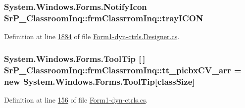 \hypertarget{class_sr_p___classroom_inq_1_1frm_classrrom_inq_a8c062d5fe665631b364688c76e36e7f7}{
\subsubsection[{tray\-I\-C\-O\-N}]{\setlength{\rightskip}{0pt plus 5cm}\-System.\-Windows.\-Forms.\-Notify\-Icon {\bf \-Sr\-P\-\_\-\-Classroom\-Inq\-::frm\-Classrrom\-Inq\-::tray\-I\-C\-O\-N}}}
\label{class_sr_p___classroom_inq_1_1frm_classrrom_inq_a8c062d5fe665631b364688c76e36e7f7}


\-Definition at line \hyperlink{_form1-dyn-ctrls_8_designer_8cs_source_l01884}{1884} of file \hyperlink{_form1-dyn-ctrls_8_designer_8cs_source}{\-Form1-\/dyn-\/ctrls.\-Designer.\-cs}.

\hypertarget{class_sr_p___classroom_inq_1_1frm_classrrom_inq_a2b443a71216ac1b9a63f9db496161a4d}{
\subsubsection[{tt\-\_\-picbx\-C\-V\-\_\-arr}]{\setlength{\rightskip}{0pt plus 5cm}\-System.\-Windows.\-Forms.\-Tool\-Tip \mbox{[}$\,$\mbox{]} {\bf \-Sr\-P\-\_\-\-Classroom\-Inq\-::frm\-Classrrom\-Inq\-::tt\-\_\-picbx\-C\-V\-\_\-arr} = new \-System.\-Windows.\-Forms.\-Tool\-Tip\mbox{[}{\bf class\-Size}\mbox{]}}}
\label{class_sr_p___classroom_inq_1_1frm_classrrom_inq_a2b443a71216ac1b9a63f9db496161a4d}


\-Definition at line \hyperlink{_form1-dyn-ctrls_8cs_source_l00156}{156} of file \hyperlink{_form1-dyn-ctrls_8cs_source}{\-Form1-\/dyn-\/ctrls.\-cs}.

